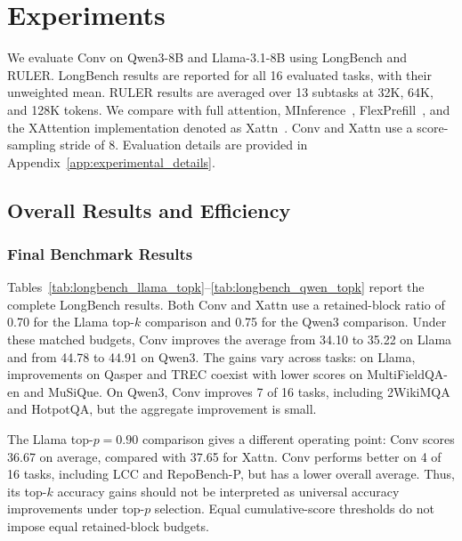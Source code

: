 \section{Experiments}
\label{sec:experiments}

We evaluate Conv on Qwen3-8B and Llama-3.1-8B using LongBench and RULER.
LongBench results are reported for all 16 evaluated tasks, with their
unweighted mean. RULER results are averaged over 13 subtasks at 32K, 64K,
and 128K tokens. We compare with full attention,
MInference~\citep{jiang2024minference},
FlexPrefill~\citep{lai2025flexprefill}, and the XAttention implementation
denoted as Xattn~\citep{xu2025xattention}. Conv and Xattn use a score-sampling
stride of 8. Evaluation details are provided in
Appendix~\ref{app:experimental_details}.

\subsection{Overall Results and Efficiency}
\label{sec:main_results_efficiency}

\subsubsection{Final Benchmark Results}
\label{sec:final_benchmark_results}

Tables~\ref{tab:longbench_llama_topk}--\ref{tab:longbench_qwen_topk}
report the complete LongBench results. Both Conv and Xattn use a retained-block
ratio of 0.70 for the Llama top-$k$ comparison and 0.75 for the Qwen3
comparison. Under these matched budgets, Conv improves the average from
34.10 to 35.22 on Llama and from 44.78 to 44.91 on Qwen3. The gains vary
across tasks: on Llama, improvements on Qasper and TREC coexist with lower
scores on MultiFieldQA-en and MuSiQue. On Qwen3, Conv improves 7 of 16 tasks,
including 2WikiMQA and HotpotQA, but the aggregate improvement is small.

The Llama top-$p=0.90$ comparison gives a different operating point:
Conv scores 36.67 on average, compared with 37.65 for Xattn. Conv performs
better on 4 of 16 tasks, including LCC and RepoBench-P, but has a lower
overall average. Thus, its top-$k$ accuracy gains should not be interpreted
as universal accuracy improvements under top-$p$ selection. Equal
cumulative-score thresholds do not impose equal retained-block budgets.

